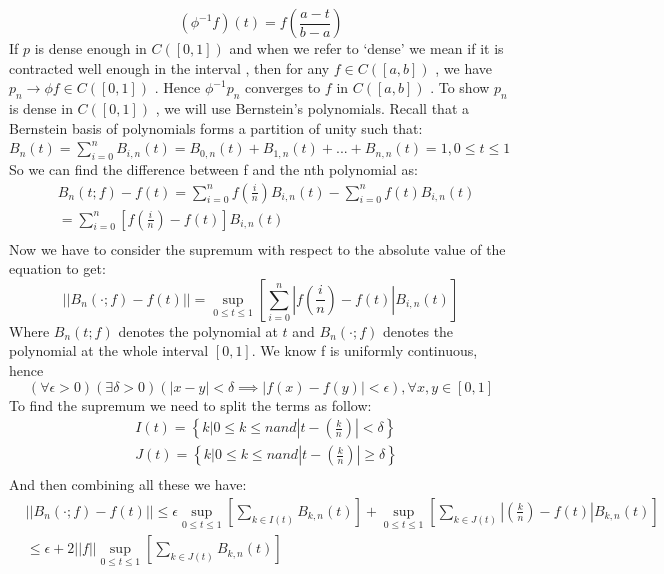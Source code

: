 \documentclass{article}
\begin{document}
\begin{equation*}
(\phi^{-1}f)(t)=f\left(\frac{a-t}{b-a}\right)    
\end{equation*}
If $p$ is dense enough in $C([0,1])$ and when we refer to `dense' we mean if it is contracted well enough in the interval , then for any $f\in C([a,b])$  , we have $p_n \rightarrow{} \phi f\in C([0,1])$ . Hence $\phi^{-1}p_n$ converges to $f$ in $C([a,b])$ . To show $p_n$ is dense in $C([ 0,1])$ , we will use Bernstein’s polynomials. Recall that a Bernstein basis of polynomials forms a partition of unity such that:
\newline
$B_n(t)=\sum_{i=0}^nB_{i,n}(t)=B_{0,n}(t)+B_{1,n}(t)+...+B_{n,n}(t)=1, 0\leq t\leq1$\newline 
So we can find the difference between f and the nth polynomial as:
\begin{align*}
&B_n(t;f)-f(t)=\sum_{i=0}^nf\left(\frac{i}{n}\right)B_{i,n}(t)-\sum_{i=0}^nf(t)B_{i,n}(t)\\
&=\sum_{i=0}^n\left[f\left(\frac{i}{n}\right)-f(t)\right]B_{i,n}(t)\\
\end{align*}
Now we have to consider the supremum with respect to the absolute value of the equation to get:
\begin{equation*}
||B_n(\cdot;f)-f(t)||=\sup_{0\leq t\leq 1}\left[\sum_{i=0}^n\left|f\left(\frac{i}{n}\right)-f(t)\right|B_{i,n}(t)\right]    
\end{equation*}
Where $B_n(t;f)$ denotes the polynomial at $t$ and $B_n(\cdot;f)$ denotes the polynomial at the whole interval $[0,1]$. We know f is uniformly continuous, hence 
\begin{equation*}
(\forall\epsilon>0)(\exists\delta>0)(|x-y|<\delta\implies|f(x)-f(y)|<\epsilon), \forall x,y\in[0,1]    
\end{equation*}
To find the supremum we need to split the terms as follow:
\begin{align*}
&I(t)=\left\{k|0\leq k\leq n and \left|t-\left(\frac{k}{n}\right)\right|<\delta\right\}\\
&J(t)=\left\{k|0\leq k\leq n and \left|t-\left(\frac{k}{n}\right)\right|\geq\delta\right\}\\
\end{align*}
And then combining all these we have:
\begin{align*}
&||B_n(\cdot;f)-f(t)||\leq\epsilon\sup_{0\leq t\leq 1}\left[\sum_{k\in I(t)}B_{k,n}(t)\right]+\sup_{0\leq t\leq 1}\left[\sum_{k\in J(t)}\left|\left(\frac{k}{n}\right)-f(t)\right|B_{k,n}(t)\right]\\
&\leq\epsilon+2||f||\sup_{0\leq t\leq 1}\left[\sum_{k\in J(t)}B_{k,n}(t)\right]\\
\end{align*}
\end{document}
